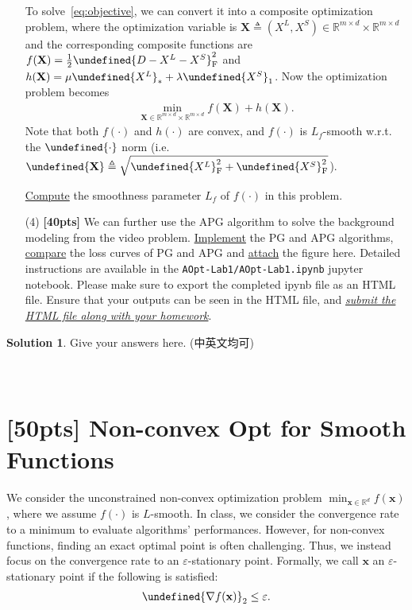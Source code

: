 \documentclass[a4paper]{article}
\numberwithin{equation}{section}
\theoremstyle{definition}
\newtheorem*{solution}{Solution}
\theoremstyle{definition}
\def \x {\textbf{x}}
\let\norm\undefined
\let\epsilon\varepsilon
\DeclarePairedDelimiter\norm{\lVert}{\rVert}
\begin{document}
\begin{enumerate}
  To solve~\eqref{eq:objective}, we can convert it into a composite optimization problem, where the optimization variable is $\mathbf{X} \triangleq (X^L, X^S)\in\mathbb{R}^{m\times d}\times \mathbb{R}^{m\times d}$ and the corresponding composite functions are  $f(\mathbf{X})=\frac{1}{2}\norm{D - X^L - X^S}_\text{F}^2$ and $h(\mathbf{X})=\mu \norm{X^L}_* + \lambda \norm{X^S}_1$. Now the optimization problem becomes
  \begin{align*}
    \min_{\mathbf{X}\in\mathbb{R}^{m\times d}\times \mathbb{R}^{m\times d}} f(\mathbf{X}) + h(\mathbf{X}).
  \end{align*}
  Note that both $f(\cdot)$ and $h(\cdot)$ are convex, and $f(\cdot)$ is $L_f$-smooth w.r.t. the $\norm{\cdot}$ norm (i.e. $\norm{\mathbf{X}}\triangleq\sqrt{\norm{X^L}_{\text{F}}^2+\norm{X^S}_{\text{F}}^2}$).
  
  \underline{Compute} the smoothness parameter $L_f$ of $f(\cdot)$ in this problem.

  \item[(4)] \textbf{[40pts]} We can further use the APG algorithm to solve the background modeling from the video problem. \underline{Implement} the PG and APG algorithms, \underline{compare} the loss curves of PG and APG and \underline{attach} the figure here. Detailed instructions are available in the \texttt{AOpt-Lab1/AOpt-Lab1.ipynb} jupyter notebook. Please make sure to export the completed ipynb file as an HTML file. Ensure that your outputs can be seen in the HTML file, and \underline{\emph{submit the HTML file along with your homework}}.
\end{enumerate}
\begin{solution}
  Give your answers here. (中英文均可)
  ~\\
  ~\\
  ~\\
\end{solution}

\newpage
\section{[50pts] Non-convex Opt for Smooth Functions}
We consider the unconstrained non-convex optimization problem $\min_{\x \in \mathbb{R}^d} f(\x)$, where we assume $f(\cdot)$ is $L$-smooth. 
In class, we consider the convergence rate to a minimum to evaluate algorithms' performances. However, for non-convex functions, finding an exact optimal point is often challenging. Thus, we instead focus on the convergence rate to an $\epsilon$-stationary point. Formally, we call $\x$ an $\epsilon$-stationary point if the following is satisfied:
\begin{align*}
  \norm{\nabla f(\x)}_2 \leq \epsilon.
\end{align*}
\end{document}
